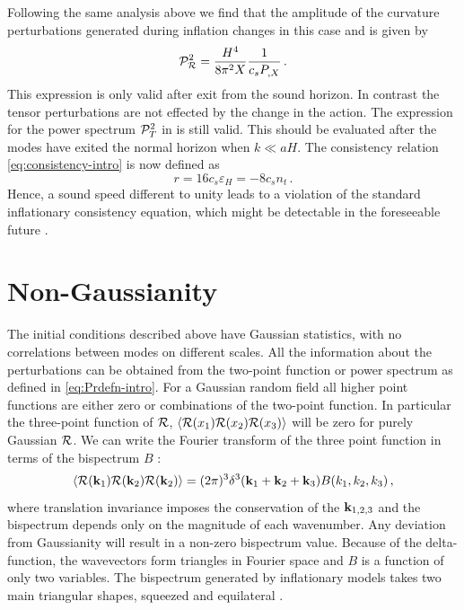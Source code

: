 Following the same analysis above we find that the amplitude of the curvature 
perturbations 
generated during inflation changes in this case and is given by \cite{gm}
% 
\begin{equation} 
\label{eq:Ps-dbiintro}
 \mathcal{P}_{\mathcal{R}}^2  = \frac{H^4}{8\pi^2 X}\frac{1}{c_s P_{,X}} \,.
\end{equation}
% 
This expression is only valid after exit from the sound horizon. In contrast
the tensor perturbations are not effected by the change in the action. The
expression for the power spectrum $\mathcal{P}_T^2$ in  is still valid.
This should be evaluated after the modes have exited the normal horizon
when $k\ll aH$. 
The consistency relation \eqref{eq:consistency-intro} is now defined as
\cite{gm} 
% 
\begin{equation}
\label{eq:rdefn-dbiintro}
  r = 16c_s \varepsilon_H = -8c_s n_t \,.
\end{equation}
% 
Hence, a sound speed different to unity leads to a violation of the 
standard inflationary consistency equation, which might be 
detectable in the foreseeable future \cite{lidser1,lidser2}. 




\section{Non-Gaussianity}
\label{sec:fnl-intro}
The initial conditions described above have Gaussian statistics, with no correlations between modes
on different scales. All the information about the perturbations can be obtained from the
two-point function or power spectrum as defined in \eqref{eq:Prdefn-intro}. For a Gaussian random 
field all higher point functions are either zero or combinations of the two-point function. In
particular the three-point function of $\mathcal{R}$, $\langle
\mathcal{R}(x_1)\mathcal{R}(x_2)\mathcal{R}(x_3)\rangle$ will be zero for purely Gaussian $\mathcal{R}$. We can
write the Fourier
transform of the three point function in terms of the bispectrum $B$
\cite{Bartolo:2004if}:
% 
\begin{equation}
 \langle \mathcal{R}(\textbf{k}_1)\mathcal{R}(\textbf{k}_2)\mathcal{R}(\textbf{k}_2)\rangle = (2\pi)^3 \delta^3(\textbf{k}_1 + \textbf{k}_2 + \textbf{k}_3) B(k_1, k_2,
k_3)\,,
\end{equation}
% 
where translation invariance imposes the conservation of the $\textbf{k}_{1,2,3}$ and
the bispectrum
depends only on the magnitude of each wavenumber. Any deviation from Gaussianity
will result in a
non-zero bispectrum value. 
Because of the delta-function, the wavevectors form triangles in Fourier
space and $B$ is a function of only two variables. The bispectrum generated by
inflationary models
takes two main triangular shapes, squeezed and equilateral \cite{Babich:2004gb}.
 
